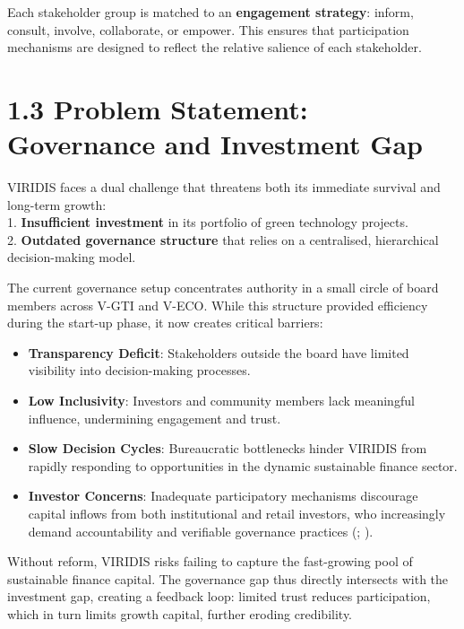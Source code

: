 \documentclass[
  english,
  12pt,
  oneside,
  open=any]{scrbook}
\providecommand{\tightlist}{%
  \setlength{\itemsep}{0pt}\setlength{\parskip}{0pt}}\usepackage{longtable,booktabs,array}
\begin{document}
Each stakeholder group is matched to an \textbf{engagement strategy}:
inform, consult, involve, collaborate, or empower. This ensures that
participation mechanisms are designed to reflect the relative salience
of each stakeholder.

\section{1.3 Problem Statement: Governance and Investment
Gap}\label{sec-problem}

VIRIDIS faces a dual challenge that threatens both its immediate
survival and long-term growth:\\
1. \textbf{Insufficient investment} in its portfolio of green technology
projects.\\
2. \textbf{Outdated governance structure} that relies on a centralised,
hierarchical decision-making model.

The current governance setup concentrates authority in a small circle of
board members across V-GTI and V-ECO. While this structure provided
efficiency during the start-up phase, it now creates critical barriers:

\begin{itemize}
\tightlist
\item
  \textbf{Transparency Deficit}: Stakeholders outside the board have
  limited visibility into decision-making processes.\\
\item
  \textbf{Low Inclusivity}: Investors and community members lack
  meaningful influence, undermining engagement and trust.\\
\item
  \textbf{Slow Decision Cycles}: Bureaucratic bottlenecks hinder VIRIDIS
  from rapidly responding to opportunities in the dynamic sustainable
  finance sector.\\
\item
  \textbf{Investor Concerns}: Inadequate participatory mechanisms
  discourage capital inflows from both institutional and retail
  investors, who increasingly demand accountability and verifiable
  governance practices
  (;
  ).
\end{itemize}

Without reform, VIRIDIS risks failing to capture the fast-growing pool
of sustainable finance capital. The governance gap thus directly
intersects with the investment gap, creating a feedback loop: limited
trust reduces participation, which in turn limits growth capital,
further eroding credibility.
\end{document}
